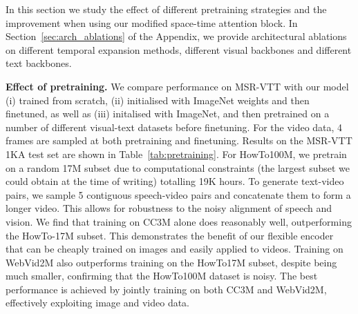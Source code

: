 \documentclass[10pt,twocolumn,letterpaper]{article}
\begin{document}
\begin{table}\centering
\caption{\textbf{Pretraining sources:} The effect of different pretraining sources. We use 4 frames per video in both pretraining and finetuning. Results are presented on the 1K-A MSR-VTT test set for text-video retrieval. \textbf{R@k:} Recall@K. \textbf{MedR:} Median Rank}
\label{tab:pretraining}
\end{table} 

In this section we study the effect of different pretraining strategies and the improvement when using our modified space-time attention block. In Section~\ref{sec:arch_ablations} of the Appendix, we provide architectural ablations on different temporal expansion methods, different visual backbones and different text backbones.

\noindent\textbf{Effect of pretraining.}
We compare performance on MSR-VTT with our model (i) trained from scratch, (ii) initialised with ImageNet weights and then 
finetuned, as well as (iii) initalised with ImageNet, and then pretrained on a number of different visual-text datasets before 
finetuning. For the video data, 4 frames are sampled at both pretraining and finetuning. Results on the MSR-VTT 1KA test set are shown in  Table~\ref{tab:pretraining}.
For HowTo100M, we pretrain on a random 17M subset due to computational constraints (the largest subset we could obtain at the time of writing) totalling 19K hours. To generate text-video pairs, we sample 5 contiguous speech-video pairs and concatenate them to form a longer video. This allows for robustness to the noisy alignment of speech and vision. We find that training on CC3M alone does reasonably well, outperforming the HowTo-17M subset. This demonstrates the benefit of our flexible encoder that can be cheaply trained on images and easily applied to videos. Training on WebVid2M also outperforms training on the HowTo17M subset, despite being much smaller, confirming that the HowTo100M dataset is noisy. The best performance is achieved by jointly training on both CC3M and WebVid2M, effectively exploiting image and video data. 
\end{document}
